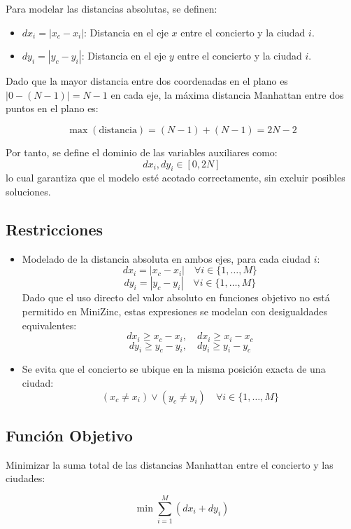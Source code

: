 \documentclass[conference]{IEEEtran}
\begin{document}
Para modelar las distancias absolutas, se definen:

\begin{itemize}
    \item $dx_i = |x_c - x_i|$: Distancia en el eje $x$ entre el concierto y la ciudad $i$.
    \item $dy_i = |y_c - y_i|$: Distancia en el eje $y$ entre el concierto y la ciudad $i$.
\end{itemize}

Dado que la mayor distancia entre dos coordenadas en el plano es $|0 - (N - 1)| = N - 1$ en cada eje, la máxima distancia Manhattan entre dos puntos en el plano es:

\[
\max(\text{distancia}) = (N - 1) + (N - 1) = 2N - 2
\]

Por tanto, se define el dominio de las variables auxiliares como:
\[
dx_i, dy_i \in [0, 2N]
\]
lo cual garantiza que el modelo esté acotado correctamente, sin excluir posibles soluciones.

\subsection*{Restricciones}

\begin{itemize}
    \item Modelado de la distancia absoluta en ambos ejes, para cada ciudad $i$:
    \[
    dx_i = |x_c - x_i| \quad \forall i \in \{1, \dots, M\}
    \]
    \[
    dy_i = |y_c - y_i| \quad \forall i \in \{1, \dots, M\}
    \]
    Dado que el uso directo del valor absoluto en funciones objetivo no está permitido en MiniZinc, estas expresiones se modelan con desigualdades equivalentes:
    \[
    dx_i \geq x_c - x_i,\quad dx_i \geq x_i - x_c
    \]
    \[
    dy_i \geq y_c - y_i,\quad dy_i \geq y_i - y_c
    \]

    \item Se evita que el concierto se ubique en la misma posición exacta de una ciudad:
    \[
    (x_c \ne x_i) \lor (y_c \ne y_i) \quad \forall i \in \{1, \dots, M\}
    \]
\end{itemize}

\subsection*{Función Objetivo}

Minimizar la suma total de las distancias Manhattan entre el concierto y las ciudades:

\[
\min \sum_{i=1}^{M} (dx_i + dy_i)
\]
\end{document}
